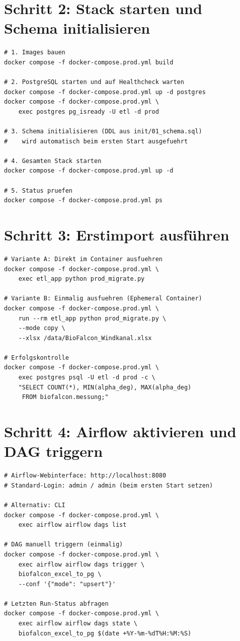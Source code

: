 \documentclass[12pt,a4paper]{report}
\theoremstyle{definition}
\theoremstyle{remark}
\begin{document}
\section{Schritt 2: Stack starten und Schema initialisieren}

\begin{lstlisting}[style=bash, caption={Deployment: Stack starten}]
# 1. Images bauen
docker compose -f docker-compose.prod.yml build

# 2. PostgreSQL starten und auf Healthcheck warten
docker compose -f docker-compose.prod.yml up -d postgres
docker compose -f docker-compose.prod.yml \
    exec postgres pg_isready -U etl -d prod

# 3. Schema initialisieren (DDL aus init/01_schema.sql)
#    wird automatisch beim ersten Start ausgefuehrt

# 4. Gesamten Stack starten
docker compose -f docker-compose.prod.yml up -d

# 5. Status pruefen
docker compose -f docker-compose.prod.yml ps
\end{lstlisting}

\section{Schritt 3: Erstimport ausführen}

\begin{lstlisting}[style=bash, caption={Erstimport: Vollstaendige Migration der Excel-Quelldatei}]
# Variante A: Direkt im Container ausfuehren
docker compose -f docker-compose.prod.yml \
    exec etl_app python prod_migrate.py

# Variante B: Einmalig ausfuehren (Ephemeral Container)
docker compose -f docker-compose.prod.yml \
    run --rm etl_app python prod_migrate.py \
    --mode copy \
    --xlsx /data/BioFalcon_Windkanal.xlsx

# Erfolgskontrolle
docker compose -f docker-compose.prod.yml \
    exec postgres psql -U etl -d prod -c \
    "SELECT COUNT(*), MIN(alpha_deg), MAX(alpha_deg)
     FROM biofalcon.messung;"
\end{lstlisting}

\section{Schritt 4: Airflow aktivieren und DAG triggern}

\begin{lstlisting}[style=bash, caption={Airflow: DAG aktivieren und manuell triggern}]
# Airflow-Webinterface: http://localhost:8080
# Standard-Login: admin / admin (beim ersten Start setzen)

# Alternativ: CLI
docker compose -f docker-compose.prod.yml \
    exec airflow airflow dags list

# DAG manuell triggern (einmalig)
docker compose -f docker-compose.prod.yml \
    exec airflow airflow dags trigger \
    biofalcon_excel_to_pg \
    --conf '{"mode": "upsert"}'

# Letzten Run-Status abfragen
docker compose -f docker-compose.prod.yml \
    exec airflow airflow dags state \
    biofalcon_excel_to_pg $(date +%Y-%m-%dT%H:%M:%S)
\end{lstlisting}
\end{document}
